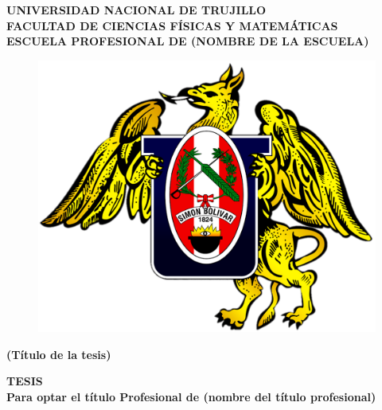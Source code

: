 \thispagestyle{empty}
	\begin{center}
		{\fontsize{20pt}{24pt}\selectfont \textbf{UNIVERSIDAD NACIONAL DE TRUJILLO}}\\
		\vspace{4 mm}
		{\fontsize{16pt}{19pt}\selectfont \textbf{FACULTAD DE CIENCIAS FÍSICAS Y MATEMÁTICAS}}\\
		\vspace{1 mm}
		{\ArialNarrow\fontsize{14pt}{16.8pt}\selectfont \textbf{ESCUELA PROFESIONAL DE (NOMBRE DE LA ESCUELA)}}\\
		\vspace{6.5 mm}
  

		\begin{figure}[h]
			\centering 
			\includegraphics[scale=0.5]{logo_unt.png}
		\end{figure}
		\vspace{1 mm}
		\onehalfspacing  %
		{\fontsize{18pt}{21.6pt}\selectfont \textbf{{(Título de la tesis)}} }\\
		
		\singlespacing  %
		
		\vspace{15 mm}
		
		{\fontsize{18pt}{21.6pt}\selectfont \textbf{TESIS} }\\
		
		\vspace{5.5 mm}	
		{\ArialNarrow\fontsize{16pt}{19pt}\selectfont \textbf{Para optar el título Profesional de (nombre del título profesional)} }\\
		\vspace{25 mm}
		

\end{center}

